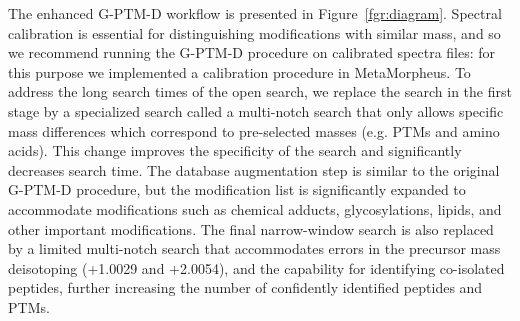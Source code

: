 \documentclass[journal=jprobs,manuscript=article]{achemso}
\begin{document}
The enhanced G-PTM-D workflow is presented in Figure~\ref{fgr:diagram}.
Spectral calibration is essential for distinguishing modifications with similar mass, and so we recommend running the G-PTM-D procedure on calibrated spectra files: for this purpose we implemented a calibration procedure in MetaMorpheus.
To address the long search times of the open search, we replace the search in the first stage by a specialized search called a multi-notch search that only allows specific mass differences which correspond to pre-selected masses (e.g. PTMs and amino acids).
This change improves the specificity of the search and significantly decreases search time.
The database augmentation step is similar to the original G-PTM-D procedure, but the modification list is significantly expanded to accommodate modifications such as chemical adducts, glycosylations, lipids, and other important modifications.
The final narrow-window search is also replaced by a limited multi-notch search that accommodates errors in the precursor mass deisotoping (+1.0029 and +2.0054), and the capability for identifying co-isolated peptides, further increasing the number of confidently identified peptides and PTMs.
\end{document}
